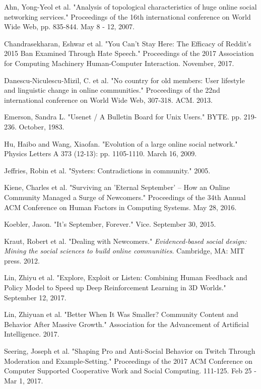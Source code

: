 \documentclass[class=book, crop=false]{standalone}
\begin{document}
Ahn, Yong-Yeol et al. "Analysis of topological characteristics of huge online social networking services." Proceedings of the 16th international conference on World Wide Web, pp. 835-844. May 8 - 12, 2007.

Chandrasekharan, Eshwar et al. "You Can't Stay Here: The Efficacy of Reddit's 2015 Ban Examined Through Hate Speech." Proceedings of the 2017 Association for Computing Machinery Human-Computer Interaction. November, 2017.

Danescu-Niculescu-Mizil, C. et al. "No country for old members: User lifestyle and linguistic change in online communities." Proceedings of the 22nd international conference on World Wide Web, 307-318. ACM. 2013.

Emerson, Sandra L. "Usenet / A Bulletin Board for Unix Users." BYTE. pp. 219-236. October, 1983.

Hu, Haibo and Wang, Xiaofan. "Evolution of a large online social network." Physics Letters A 373 (12-13): pp. 1105-1110. March 16, 2009.

Jeffries, Robin et al. "Systers: Contradictions in community." 2005.

Kiene, Charles et al. "Surviving an 'Eternal September' -- How an Online Community Managed a Surge of Newcomers." Proceedings of the 34th Annual ACM Conference on Human Factors in Computing Systems. May 28, 2016.

Koebler, Jason. "It's September, Forever." Vice. September 30, 2015.

Kraut, Robert et al. "Dealing with Newcomers." \textit{Evidenced-based social design: Mining the social sciences to build online communities}. Cambridge, MA: MIT press. 2012.

Lin, Zhiyu et al. "Explore, Exploit or Listen: Combining Human Feedback and Policy Model to Speed up Deep Reinforcement Learning in 3D Worlds." September 12, 2017.

Lin, Zhiyuan et al. "Better When It Was Smaller? Community Content and Behavior After Massive Growth." Association for the Advancement of Artificial Intelligence. 2017.

Seering, Joseph et al. "Shaping Pro and Anti-Social Behavior on Twitch Through Moderation and Example-Setting." Proceedings of the 2017 ACM Conference on Computer Supported Cooperative Work and Social Computing. 111-125. Feb 25 - Mar 1, 2017.
\end{document}
